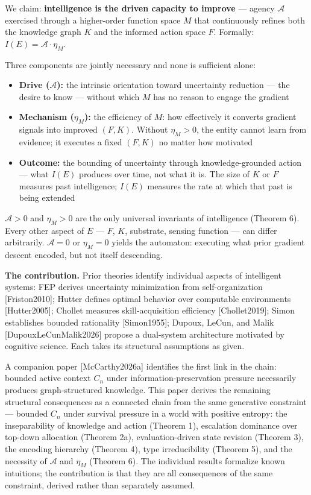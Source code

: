\documentclass[
]{article}
\newcounter{none} %
\providecommand{\tightlist}{%
  \setlength{\itemsep}{0pt}\setlength{\parskip}{0pt}}
\begin{document}
We claim: \textbf{intelligence is the driven capacity to improve} ---
agency \(\mathcal{A}\) exercised through a higher-order function space
\(M\) that continuously refines both the knowledge graph \(K\) and the
informed action space \(F\). Formally:
\(I(E) = \mathcal{A} \cdot \eta_M\).

Three components are jointly necessary and none is sufficient alone:

\begin{itemize}
\tightlist
\item
  \textbf{Drive (\(\mathcal{A}\)):} the intrinsic orientation toward
  uncertainty reduction --- the desire to know --- without which \(M\)
  has no reason to engage the gradient
\item
  \textbf{Mechanism (\(\eta_M\)):} the efficiency of \(M\): how
  effectively it converts gradient signals into improved \((F, K)\).
  Without \(\eta_M > 0\), the entity cannot learn from evidence; it
  executes a fixed \((F, K)\) no matter how motivated
\item
  \textbf{Outcome:} the bounding of uncertainty through
  knowledge-grounded action --- what \(I(E)\) produces over time, not
  what it is. The size of \(K\) or \(F\) measures past intelligence;
  \(I(E)\) measures the rate at which that past is being extended
\end{itemize}

\(\mathcal{A} > 0\) and \(\eta_M > 0\) are the only universal invariants
of intelligence (Theorem 6). Every other aspect of \(E\) --- \(F\),
\(K\), substrate, sensing function --- can differ arbitrarily.
\(\mathcal{A} = 0\) or \(\eta_M = 0\) yields the automaton: executing
what prior gradient descent encoded, but not itself descending.

\textbf{The contribution.} Prior theories identify individual aspects of
intelligent systems: FEP derives uncertainty minimization from
self-organization {[}Friston2010{]}; Hutter defines optimal behavior
over computable environments {[}Hutter2005{]}; Chollet measures
skill-acquisition efficiency {[}Chollet2019{]}; Simon establishes
bounded rationality {[}Simon1955{]}; Dupoux, LeCun, and Malik
{[}DupouxLeCunMalik2026{]} propose a dual-system architecture motivated
by cognitive science. Each takes its structural assumptions as given.

A companion paper {[}McCarthy2026a{]} identifies the first link in the
chain: bounded active context \(C_n\) under information-preservation
pressure necessarily produces graph-structured knowledge. This paper
derives the remaining structural consequences as a connected chain from
the same generative constraint --- bounded \(C_n\) under survival
pressure in a world with positive entropy: the inseparability of
knowledge and action (Theorem 1), escalation dominance over top-down
allocation (Theorem 2a), evaluation-driven state revision (Theorem 3),
the encoding hierarchy (Theorem 4), type irreducibility (Theorem 5),
and the necessity of \(\mathcal{A}\) and \(\eta_M\) (Theorem 6). The
individual results formalize known intuitions; the contribution is that
they are all consequences of the same constraint, derived rather than
separately assumed.
\end{document}
